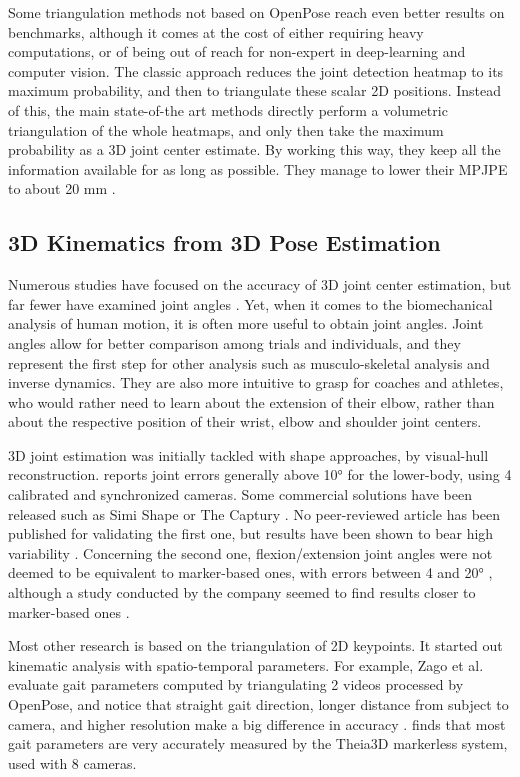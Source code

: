 Some triangulation methods not based on OpenPose reach even better results on benchmarks, although it comes at the cost of either requiring heavy computations, or of being out of reach for non-expert in deep-learning and computer vision. The classic approach reduces the joint detection heatmap to its maximum probability, and then to triangulate these scalar 2D positions. Instead of this, the main state-of-the art methods directly perform a volumetric triangulation of the whole heatmaps, and only then take the maximum probability as a 3D joint center estimate. By working this way, they keep all the information available for as long as possible. They manage to lower their MPJPE to about 20 mm \cite{He2020,Iskakov2019}. 


\subsection{3D Kinematics from 3D Pose Estimation}

Numerous studies have focused on the accuracy of 3D joint center estimation, but far fewer have examined joint angles \cite{Zheng2022}. Yet, when it comes to the biomechanical analysis of human motion, it is often more useful to obtain joint angles. Joint angles allow for better comparison among trials and individuals, and they represent the first step for other analysis such as musculo-skeletal analysis and inverse dynamics. They are also more intuitive to grasp for coaches and athletes, who would rather need to learn about the extension of their elbow, rather than about the respective position of their wrist, elbow and shoulder joint centers. 

3D joint estimation was initially tackled with shape approaches, by visual-hull reconstruction. \cite{Ceseracciu2014} reports joint errors generally above 10° for the lower-body, using 4 calibrated and synchronized cameras. Some commercial solutions have been released such as Simi Shape \cite{SimiShape} or The Captury \cite{Captury}. No peer-reviewed article has been published for validating the first one, but results have been shown to bear high variability \cite{Becker2015}. Concerning the second one, flexion/extension joint angles were not deemed to be equivalent to marker-based ones, with errors between 4 and 20° \cite{Harsted2019}, although a study conducted by the company seemed to find results closer to marker-based ones \cite{Fleisig2022}. 

Most other research is based on the triangulation of 2D keypoints. It started out kinematic analysis with spatio-temporal parameters. For example, Zago et al. evaluate gait parameters computed by triangulating 2 videos processed by OpenPose, and notice that straight gait direction, longer distance from subject to camera, and higher resolution make a big difference in accuracy \cite{Zago2020}. \cite{Kanko2021c} finds that most gait parameters are very accurately measured by the Theia3D markerless system, used with 8 cameras.

